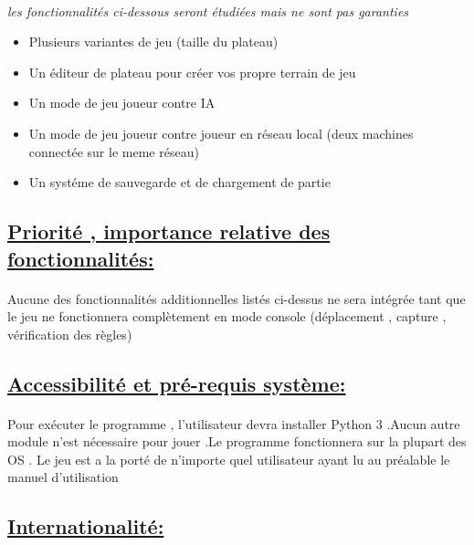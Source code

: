 \documentclass[a4paper,12pt]{article}
\begin{document}
\paragraph{}
\begin{center}
\emph{les fonctionnalités ci-dessous seront étudiées mais ne sont pas garanties }
\end{center}
\begin{itemize}
\item Plusieurs variantes de jeu (taille du plateau)
\item Un éditeur de plateau pour créer vos propre terrain de jeu
\item Un mode de jeu joueur contre IA
\item Un mode de jeu joueur contre joueur en réseau local (deux machines connectée sur le meme réseau)
\item Un systéme de sauvegarde et de chargement de partie
\end{itemize}


\subsection{\underline{Priorité , importance relative des fonctionnalités:}}
\paragraph{}
Aucune des fonctionnalités additionnelles listés ci-dessus ne sera intégrée tant que le jeu ne fonctionnera complètement en mode console (déplacement , capture , vérification des règles)

\subsection{\underline{Accessibilité et pré-requis système:}}
\paragraph{}
Pour exécuter le programme , l'utilisateur devra installer Python 3 .Aucun autre module n'est nécessaire pour jouer .Le programme fonctionnera sur la plupart des OS .
\newline
Le jeu est a la porté de n'importe quel utilisateur ayant lu au préalable le manuel d'utilisation


\subsection{\underline{Internationalité:}}
\end{document}
